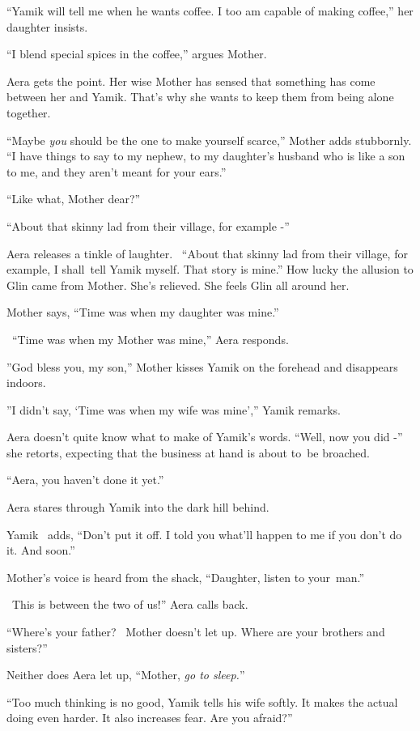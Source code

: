 \documentclass[letterpaper]{article}
\begin{document}
{}``Yamik will tell me when he wants coffee. I too am capable of making coffee,'' her daughter insists.

{}``I blend special spices in the coffee,'' argues Mother. 

Aera gets the point. Her wise Mother has sensed that something has come between her and Yamik. That's why she wants to
keep them from being alone together. 

{}``Maybe \textit{you} should be the one to make yourself scarce,'' Mother adds stubbornly. ``I have things to say to my
nephew, to my daughter's husband who is like a son to me, and they aren't meant for your ears.'' 

{}``Like what, Mother dear?'' 

{}``About that skinny{ }lad from their village, for example -'' 

Aera releases a tinkle of laughter. ~``About that skinny lad from their village, for example, I shall~tell Yamik myself.
That story is mine.'' How lucky the allusion to Glin came from Mother. She's relieved. She feels Glin all around her. 

Mother says, ``Time was when my daughter was mine.'' 

\ {}``Time was when my Mother was mine,'' Aera responds.

{}''God bless you, my son,'' Mother kisses Yamik on the forehead and disappears indoors.

{}''I didn't say, `Time was when my wife was mine','' Yamik remarks.

Aera doesn't quite know what to make of Yamik's words. ``Well, now you did{
-}{}'' she retorts, expecting that the business at hand is about to~be broached. 

{}``Aera, you haven't done it yet.''~ 

Aera stares through Yamik into the dark hill behind. 

Yamik \ adds, ``Don't put it off. I told you what'll happen to me if you don't do it. And soon.'' 

Mother's voice is heard from the shack, ``Daughter, listen to your~man.'' 

~{\textquotedbl}This is between the two of us!'' Aera calls back.

{}``Where's your father?{\textquotedbl} ~Mother doesn't let up. {\textquotedbl}Where{ }are your brothers
and sisters?'' 

Neither does Aera let up, ``Mother, \textit{go to sleep.}{}'' 

{}``Too much thinking is no good,{\textquotedbl} Yamik tells his wife softly. {\textquotedbl}It makes the actual doing
even harder. It also increases fear. Are you afraid?'' 
\end{document}
